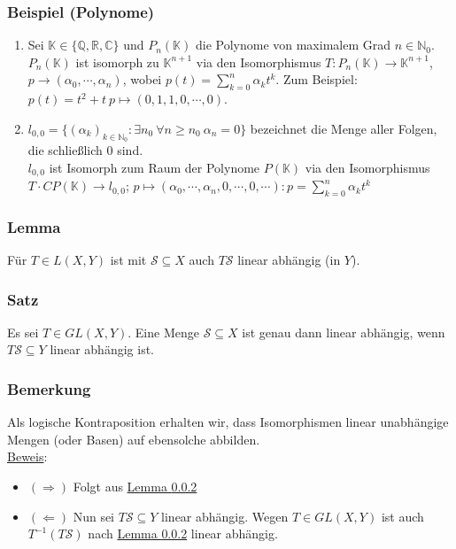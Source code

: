\subsubsection{Beispiel (Polynome)}
\renewcommand{\labelenumi}{(\arabic{enumi})}
\begin{enumerate}
\item Sei $\mathbb{K}\in \{\mathbb{Q},\mathbb{R},\mathbb{C}\}$ und $P_n(\mathbb{K})$ die Polynome von maximalem Grad $n\in \mathbb{N}_0$. $P_n(\mathbb{K})$ ist isomorph zu $\mathbb{K}^{n+1}$ via den Isomorphismus $T: P_n(\mathbb{K})\rightarrow \mathbb{K}^{n+1}$, $p\rightarrow (\alpha _0,\cdots ,\alpha _n)$, wobei $p(t)=\sum_{k=0}^n\alpha _kt^k$. Zum Beispiel: $p(t)=t^2+t\ p\mapsto (0,1,1, 0,\cdots ,0)$.
\item $l_{0,0}=\{(\alpha _k)_{k\in \mathbb{N}_0}:\exists n_0\ \forall n\geq n_0\ \alpha _n=0\}$ bezeichnet die Menge aller Folgen, die schließlich $0$ sind.\\
$l_{0,0}$ ist Isomorph zum Raum der Polynome $P(\mathbb{K})$ via den Isomorphismus $T\cdot C P(\mathbb{K})\rightarrow l_{0,0}$; $p\mapsto (\alpha _0,\cdots ,\alpha _n,0,\cdots, 0,\cdots ): p=\sum_{k=0}^n\alpha _kt^k$
\end{enumerate}
\subsubsection{Lemma}
\label{3.2.5}
Für $T\in L(X,Y)$ ist mit $\mathcal{S}\subseteq X$ auch $T\mathcal{S}$ linear abhängig (in $Y$).
\subsubsection{Satz}
\label{3.2.6}
Es sei $T\in GL(X,Y)$.  Eine Menge $\mathcal{S}\subseteq X$ ist genau dann linear abhängig, wenn $T\mathcal{S}\subseteq Y$ linear abhängig ist.
\subsubsection{Bemerkung}
Als logische Kontraposition erhalten wir, dass Isomorphismen linear unabhängige Mengen (oder Basen) auf ebensolche abbilden.\\
\underline{Beweis}:
\begin{itemize}
\item $(\Rightarrow )$ Folgt aus \hyperref[3.2.5]{Lemma \ref*{3.2.5}}
\item $(\Leftarrow )$ Nun sei $T\mathcal{S}\subseteq Y$ linear abhängig.  Wegen $T\in GL(X,Y)$ ist auch $T^{-1}(T\mathcal{S})$ nach \hyperref[3.2.5]{Lemma \ref*{3.2.5}} linear abhängig.
\end{itemize}
